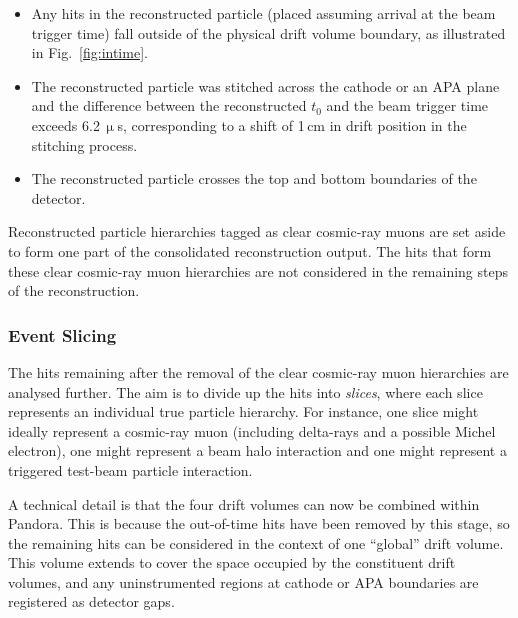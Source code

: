 \documentclass[epjc3]{svjour3}
\begin{document}
\begin{itemize}
\item Any hits in the reconstructed particle (placed assuming arrival at the beam trigger time) fall outside of the physical drift volume boundary, as illustrated in Fig.~\ref{fig:intime}.
\item The reconstructed particle was stitched across the cathode or an APA plane and the difference between the reconstructed $t_0$ and the beam trigger time exceeds 6.2\,$\upmu$s, corresponding to a shift of 1\,cm in drift position in the stitching process.
\item The reconstructed particle crosses the top and bottom boundaries of the detector.
\end{itemize}

Reconstructed particle hierarchies tagged as clear cosmic-ray muons are set aside to form one part of the consolidated reconstruction output. The hits that form these clear cosmic-ray muon hierarchies are not considered in the remaining steps of the reconstruction.

\subsubsection{Event Slicing}
The hits remaining after the removal of the clear cosmic-ray muon hierarchies are analysed further. The aim is to divide up the hits into \textit{slices}, where each slice represents an individual true particle hierarchy. For instance, one slice might ideally represent a cosmic-ray muon (including delta-rays and a possible Michel electron), one might represent a beam halo interaction and one might represent a triggered test-beam particle interaction.


A technical detail is that the four drift volumes can now be combined within Pandora. This is because the out-of-time hits have been removed by this stage, so the remaining hits can be considered in the context of one ``global'' drift volume. This volume extends to cover the space occupied by the constituent drift volumes, and any uninstrumented regions at cathode or APA boundaries are registered as detector gaps.
\end{document}

